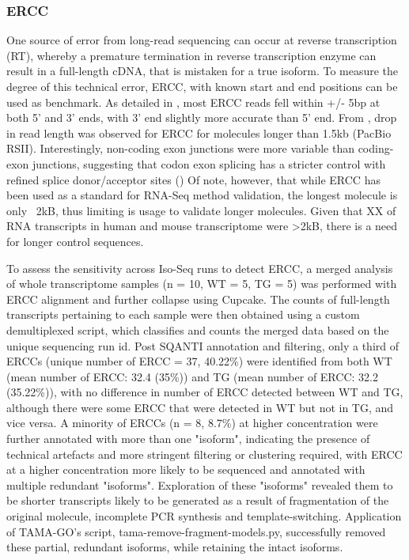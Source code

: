 \subsubsection{ERCC}
One source of error from long-read sequencing can occur at reverse transcription (RT), whereby a premature termination in reverse transcription enzyme can result in a full-length cDNA, that is mistaken for a true isoform. To measure the degree of this technical error, ERCC, with known start and end positions can be used as benchmark. As detailed in \cite{Karlsson2017}, most ERCC reads fell within +/- 5bp at both 5' and 3' ends, with 3' end slightly more accurate than 5' end. From \cite{Sharon2013}, drop in read length was observed for ERCC for molecules longer than 1.5kb (PacBio RSII). Interestingly, non-coding exon junctions were more variable than coding-exon junctions, suggesting that codon exon splicing has a stricter control with refined splice donor/acceptor sites (\cite{Karlsson2017}) 
Of note, however, that while ERCC has been used as a standard for RNA-Seq method validation, the longest molecule is only ~2kB, thus limiting is usage to validate longer molecules. Given that XX of RNA transcripts in human and mouse transcriptome were >2kB, there is a need for longer control sequences. 

To assess the sensitivity across Iso-Seq runs to detect ERCC, a merged analysis of whole transcriptome samples (n = 10, WT = 5, TG = 5) was performed with ERCC alignment and further collapse using Cupcake. The counts of full-length transcripts pertaining to each sample were then obtained using a custom demultiplexed script, which classifies and counts the merged data based on the unique sequencing run id. Post SQANTI annotation and filtering, only a third of ERCCs (unique number of ERCC = 37, 40.22\%) were identified from both WT (mean number of ERCC: 32.4 (35\%)) and TG (mean number of ERCC: 32.2 (35.22\%)), with no difference in number of ERCC detected between WT and TG, although there were some ERCC that were detected in WT but not in TG, and vice versa. A minority of ERCCs (n = 8, 8.7\%) at higher concentration were further annotated with more than one "isoform", indicating the presence of technical artefacts and more stringent filtering or clustering required, with ERCC at a higher concentration more likely to be sequenced and annotated with multiple redundant "isoforms". Exploration of these "isoforms" revealed them to be shorter transcripts likely to be generated as a result of fragmentation of the original molecule, incomplete PCR synthesis and template-switching. Application of TAMA-GO's script, tama-remove-fragment-models.py, successfully removed these partial, redundant isoforms, while retaining the intact isoforms. 

